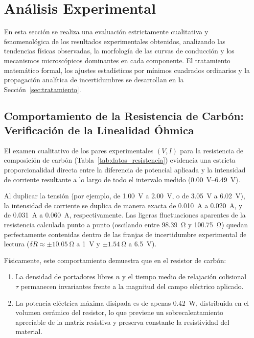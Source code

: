 
\section{Análisis Experimental}
\label{sec:analisis_exp}

En esta sección se realiza una evaluación estrictamente cualitativa y fenomenológica de los resultados experimentales obtenidos, analizando las tendencias físicas observadas, la morfología de las curvas de conducción y los mecanismos microscópicos dominantes en cada componente. El tratamiento matemático formal, los ajustes estadísticos por mínimos cuadrados ordinarios y la propagación analítica de incertidumbres se desarrollan en la Sección~\ref{sec:tratamiento}.

\subsection{Comportamiento de la Resistencia de Carbón: Verificación de la Linealidad Óhmica}
El examen cualitativo de los pares experimentales $(V, I)$ para la resistencia de composición de carbón (Tabla~\ref{tab:datos_resistencia}) evidencia una estricta proporcionalidad directa entre la diferencia de potencial aplicada y la intensidad de corriente resultante a lo largo de todo el intervalo medido (\qtyrange{0,00}{6,49}{\volt}). 

Al duplicar la tensión (por ejemplo, de \qty{1,00}{\volt} a \qty{2,00}{\volt}, o de \qty{3,05}{\volt} a \qty{6,02}{\volt}), la intensidad de corriente se duplica de manera exacta de \qty{0,010}{\ampere} a \qty{0,020}{\ampere}, y de \qty{0,031}{\ampere} a \qty{0,060}{\ampere}, respectivamente. Las ligeras fluctuaciones aparentes de la resistencia calculada punto a punto (oscilando entre \qty{98,39}{\ohm} y \qty{100,75}{\ohm}) quedan perfectamente contenidas dentro de las franjas de incertidumbre experimental de lectura ($\delta R \approx \pm\qty{10,05}{\ohm}$ a \qty{1}{\volt} y $\pm\qty{1,54}{\ohm}$ a \qty{6,5}{\volt}).

Físicamente, este comportamiento demuestra que en el resistor de carbón:
\begin{enumerate}
    \item La densidad de portadores libres $n$ y el tiempo medio de relajación colisional $\tau$ permanecen invariantes frente a la magnitud del campo eléctrico aplicado.
    \item La potencia eléctrica máxima disipada es de apenas \qty{0,42}{\watt}, distribuida en el volumen cerámico del resistor, lo que previene un sobrecalentamiento apreciable de la matriz resistiva y preserva constante la resistividad del material.
\end{enumerate}

